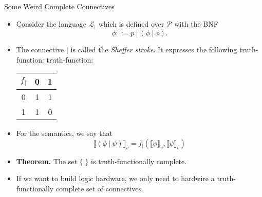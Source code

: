 \begin{frame}{Some Weird Complete Connectives}

  \begin{itemize}

    \item Consider the language $\mathcal{L}_|$ which is defined over
      $\mathcal{P}$ with the BNF \[\phi::=p~|~(\phi~|~\phi).\]

      \item The connective $|$ is called the \emph{Sheffer stroke}. It expresses the
        following truth-function:
        truth-function:

        \begin{center}
          \begin{tabular}[h!]{c | c c}
            $f_|$ & 0 & 1\\\hline
            0     & 1 & 1\\
            1     & 1 & 0
          \end{tabular}
        \end{center}
       \item For the semantics, we say that \[\llbracket
         (\phi~|~\psi)\rrbracket_v=f_|(\llbracket \phi\rrbracket_v,
         \llbracket\psi\rrbracket_v)\]

       \item \textbf{Theorem.} The set $\{|\}$ is truth-functionally
         complete.

         \item If we want to build logic hardware, we only need to
           hardwire a truth-functionally complete set of connectives.
    
  \end{itemize}
  
\end{frame}

